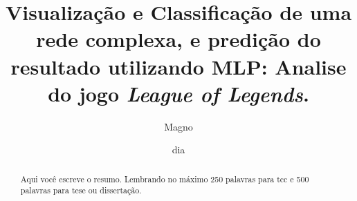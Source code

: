 \documentclass[tg]{mdtufsm}
\title{Visualização e Classificação de uma rede complexa, e predição do resultado utilizando MLP: Analise do jogo \textit{League of Legends}. }
\author{Magno}{Guilherme}
\institute{Centro de Tecnologia}
\date{dia}{mês}{2018}
\begin{document}
	
	

\maketitle

\restoregeometry

	
\makeapprove




\begin{abstract}
		
Aqui você escreve o resumo. Lembrando no máximo 250 palavras para tcc e 500 palavras para tese ou dissertação.

\end{abstract}
\end{document}
